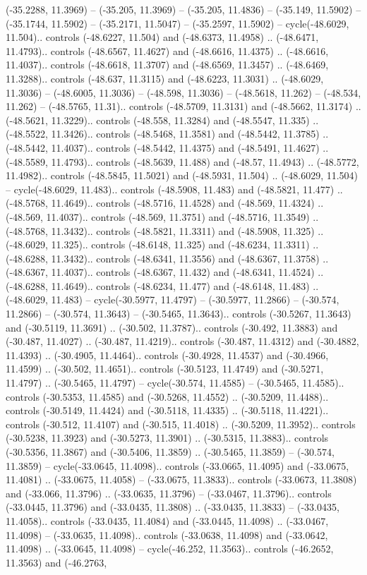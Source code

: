 \begin{scope}[shift={(2.5552, 9.9912)}]
\begin{scope}[shift={(48.1654, -14.8546)}]
(-35.2288, 11.3969) -- (-35.205, 11.3969) -- (-35.205, 11.4836) -- (-35.149, 11.5902) -- (-35.1744, 11.5902) -- (-35.2171, 11.5047) -- (-35.2597, 11.5902) -- cycle(-48.6029, 11.504).. controls (-48.6227, 11.504) and (-48.6373, 11.4958) .. (-48.6471, 11.4793).. controls (-48.6567, 11.4627) and (-48.6616, 11.4375) .. (-48.6616, 11.4037).. controls (-48.6618, 11.3707) and (-48.6569, 11.3457) .. (-48.6469, 11.3288).. controls (-48.637, 11.3115) and (-48.6223, 11.3031) .. (-48.6029, 11.3036) -- (-48.6005, 11.3036) -- (-48.598, 11.3036) -- (-48.5618, 11.262) -- (-48.534, 11.262) -- (-48.5765, 11.31).. controls (-48.5709, 11.3131) and (-48.5662, 11.3174) .. (-48.5621, 11.3229).. controls (-48.558, 11.3284) and (-48.5547, 11.335) .. (-48.5522, 11.3426).. controls (-48.5468, 11.3581) and (-48.5442, 11.3785) .. (-48.5442, 11.4037).. controls (-48.5442, 11.4375) and (-48.5491, 11.4627) .. (-48.5589, 11.4793).. controls (-48.5639, 11.488) and (-48.57, 11.4943) .. (-48.5772, 11.4982).. controls (-48.5845, 11.5021) and (-48.5931, 11.504) .. (-48.6029, 11.504) -- cycle(-48.6029, 11.483).. controls (-48.5908, 11.483) and (-48.5821, 11.477) .. (-48.5768, 11.4649).. controls (-48.5716, 11.4528) and (-48.569, 11.4324) .. (-48.569, 11.4037).. controls (-48.569, 11.3751) and (-48.5716, 11.3549) .. (-48.5768, 11.3432).. controls (-48.5821, 11.3311) and (-48.5908, 11.325) .. (-48.6029, 11.325).. controls (-48.6148, 11.325) and (-48.6234, 11.3311) .. (-48.6288, 11.3432).. controls (-48.6341, 11.3556) and (-48.6367, 11.3758) .. (-48.6367, 11.4037).. controls (-48.6367, 11.432) and (-48.6341, 11.4524) .. (-48.6288, 11.4649).. controls (-48.6234, 11.477) and (-48.6148, 11.483) .. (-48.6029, 11.483) -- cycle(-30.5977, 11.4797) -- (-30.5977, 11.2866) -- (-30.574, 11.2866) -- (-30.574, 11.3643) -- (-30.5465, 11.3643).. controls (-30.5267, 11.3643) and (-30.5119, 11.3691) .. (-30.502, 11.3787).. controls (-30.492, 11.3883) and (-30.487, 11.4027) .. (-30.487, 11.4219).. controls (-30.487, 11.4312) and (-30.4882, 11.4393) .. (-30.4905, 11.4464).. controls (-30.4928, 11.4537) and (-30.4966, 11.4599) .. (-30.502, 11.4651).. controls (-30.5123, 11.4749) and (-30.5271, 11.4797) .. (-30.5465, 11.4797) -- cycle(-30.574, 11.4585) -- (-30.5465, 11.4585).. controls (-30.5353, 11.4585) and (-30.5268, 11.4552) .. (-30.5209, 11.4488).. controls (-30.5149, 11.4424) and (-30.5118, 11.4335) .. (-30.5118, 11.4221).. controls (-30.512, 11.4107) and (-30.515, 11.4018) .. (-30.5209, 11.3952).. controls (-30.5238, 11.3923) and (-30.5273, 11.3901) .. (-30.5315, 11.3883).. controls (-30.5356, 11.3867) and (-30.5406, 11.3859) .. (-30.5465, 11.3859) -- (-30.574, 11.3859) -- cycle(-33.0645, 11.4098).. controls (-33.0665, 11.4095) and (-33.0675, 11.4081) .. (-33.0675, 11.4058) -- (-33.0675, 11.3833).. controls (-33.0673, 11.3808) and (-33.066, 11.3796) .. (-33.0635, 11.3796) -- (-33.0467, 11.3796).. controls (-33.0445, 11.3796) and (-33.0435, 11.3808) .. (-33.0435, 11.3833) -- (-33.0435, 11.4058).. controls (-33.0435, 11.4084) and (-33.0445, 11.4098) .. (-33.0467, 11.4098) -- (-33.0635, 11.4098).. controls (-33.0638, 11.4098) and (-33.0642, 11.4098) .. (-33.0645, 11.4098) -- cycle(-46.252, 11.3563).. controls (-46.2652, 11.3563) and (-46.2763, 
\end{scope}
\end{scope}
